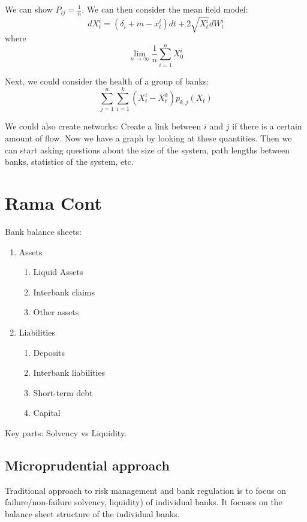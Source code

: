 We can show $P_{ij}=\frac{1}{n}$. We can then consider the mean field model:
\begin{equation}
	dX_t^i = \left( \delta_i + m - x_t^i \right) dt + 2 \sqrt{X_t^i }dW_t^i
\end{equation}
where
\begin{equation}
	\lim_{n\to \infty} \frac{1}{n} \sum_{i=1}^n X_0^i 
\end{equation}

Next, we could consider the health of a group of banks:
\begin{equation}
	\sum_{j=1}^n \sum_{i=1}^k \left( X_t^i - X_t^k \right)p_{k, j} (X_t)
\end{equation}

We could also create networks: Create a link between $i$ and $j$ if there is a certain amount of flow. Now we have a graph by looking at these quantities.
Then we can start asking questions about the size of the system, path lengths between banks, statistics of the system, etc.

\chapter{Rama Cont}
Bank balance sheets:
\begin{enumerate}
	\item Assets
	\begin{enumerate}
	\item Liquid Assets
	\item Interbank claims
		\item Other assets
	\end{enumerate}
	\item Liabilities
	\begin{enumerate}
		\item Deposits
		\item Interbank liabilities
		\item Short-term debt
		\item Capital
	\end{enumerate}
\end{enumerate}

Key parts: Solvency vs Liquidity.

\section{Microprudential approach}
Traditional approach to risk management and bank regulation is to focus on failure/non-failure solvency, liquidity) of individual banks. It focuses on the balance sheet structure of the individual banks.

